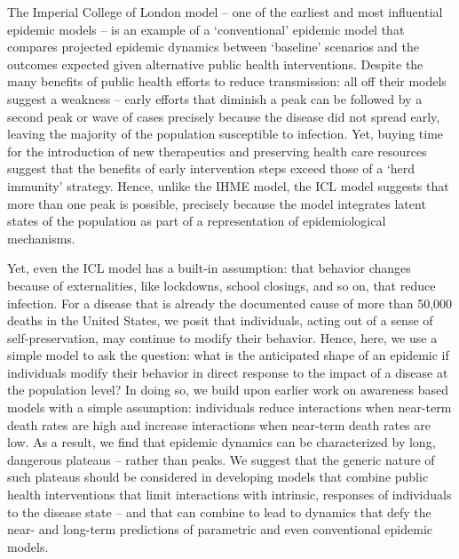 The Imperial College of London model -- one of the earliest and most influential epidemic models -- is an example of a `conventional' epidemic model
that compares projected epidemic dynamics
between `baseline' scenarios and the outcomes expected
given alternative public health interventions. Despite the many
benefits of public health efforts to reduce transmission: all off their
models suggest a weakness -- early efforts that diminish a peak can be
followed by a second peak or wave of cases precisely because
the disease did not spread early, leaving the majority of the population
susceptible to infection. Yet, buying time for the introduction
of new therapeutics and preserving health care resources suggest
that the benefits of  early intervention steps exceed those of
a `herd immunity' strategy.  Hence, unlike the IHME model,
the ICL model suggests that more than one peak is possible,
precisely because the model integrates latent states of the population
as part of a representation of epidemiological mechanisms.

Yet, even the ICL model has a built-in assumption: that 
behavior changes because of externalities, like lockdowns,
school closings, and so on, that reduce infection.  For a disease
that is already the documented cause of more than 50,000 deaths
in the United States, we posit that individuals, acting
out of a sense of self-preservation, may continue to modify
their behavior.  Hence, here, we use a simple model to
ask the question: what is the anticipated
shape of an epidemic if individuals modify their behavior in direct
response to the impact of a disease at the population level? In doing so,
we build upon earlier work on awareness based models with a
simple assumption: individuals reduce interactions when near-term
death rates are high and increase interactions when near-term death
rates are low.  As a result, we find that epidemic dynamics
can be characterized by long, dangerous plateaus -- rather than peaks.
We suggest that the generic nature of such plateaus should
be considered in developing models that combine
public health interventions that limit interactions with
intrinsic, responses of individuals to the disease state -- and that
can combine to lead to dynamics that defy the near- and long-term
predictions of parametric and even conventional epidemic models.

